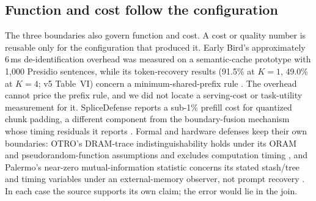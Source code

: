 
\subsection{Function and cost follow the configuration}\label{sec:cache-decisions}
The three boundaries also govern function and cost. A cost or quality number is reusable only for the configuration that produced it. Early Bird's approximately 6\,ms de-identification overhead was measured on a semantic-cache prototype with 1,000 Presidio sentences, while its token-recovery results (91.5\% at $K{=}1$, 49.0\% at $K{=}4$; v5 Table~VI) concern a minimum-shared-prefix rule \cite[V-A--B]{earlybird2025}. The overhead cannot price the prefix rule, and we did not locate a serving-cost or task-utility measurement for it. SpliceDefense reports a sub-1\% prefill cost for quantized chunk padding, a different component from the boundary-fusion mechanism whose timing residuals it reports \cite[VII-C, Table~II]{spliceleak2026}. Formal and hardware defenses keep their own boundaries: OTRO's DRAM-trace indistinguishability holds under its ORAM and pseudorandom-function assumptions and excludes computation timing \cite{lee2026otro}, and Palermo's near-zero mutual-information statistic concerns its stated stash/tree and timing variables under an external-memory observer, not prompt recovery \cite{ye2024palermo}. In each case the source supports its own claim; the error would lie in the join.
